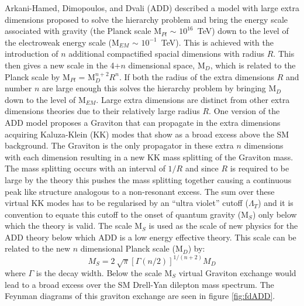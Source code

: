         Arkani-Hamed, Dimopoulos, and Dvali (ADD) \cite{ArkaniHamed:1998rs} described a model with large extra dimensions proposed to solve the hierarchy problem and bring the energy scale associated with gravity (the Planck scale M$_{Pl}$ $\sim$ $10^{16}$~TeV) down to the level of the electroweak energy scale (M$_{EM}$ $\sim$ $10^{-1}$~TeV). This is achieved with the introduction of $n$ additional compactified spacial dimensions with radius $R$. This then gives a new scale in the 4+$n$ dimensional space, M$_{D}$, which is related to the Planck scale by M$_{Pl}$ = M$_{D}^{n+2}R^{n}$. If both the radius of the extra dimensions $R$ and number $n$ are large enough this solves the hierarchy problem by bringing M$_{D}$ down to the level of M$_{EM}$. Large extra dimensions are distinct from other extra dimensions theories due to their relatively large radius $R$.
        One version of the ADD model proposes a Graviton that can propagate in the extra dimensions acquiring Kaluza-Klein (KK) modes that show as a broad excess above the SM background. The Graviton is the only propagator in these extra $n$ dimensions with each dimension resulting in a new KK mass splitting of the Graviton mass. The mass splitting occurs with an interval of $1/R$ and since $R$ is required to be large by the theory this pushes the mass splitting together causing a continuous peak like structure analogous to a non-resonant excess. The sum over these virtual KK modes has to be regularised by an ``ultra violet'' cutoff ($\Lambda_{T}$) and it is convention to equate this cutoff to the onset of quantum gravity (M$_{S}$) only below which the theory is valid. The scale M$_{S}$ is used as the scale of new physics for the ADD theory below which ADD is a low energy effective theory. This scale can be related to the new $n$ dimensional Planck scale (M$_{D}$) by:
        \begin{equation}
            M_{S} = 2~\sqrt{\pi}\left[{\Gamma (n/2)}\right]^{1/(n+2)}M_{D}
            \label{eq:gravScale}
        \end{equation}
        where $\Gamma$ is the decay width. Below the scale M$_{S}$ virtual Graviton exchange would lead to a broad excess over the SM Drell-Yan dilepton mass spectrum. The Feynman diagrams of this graviton exchange are seen in figure \ref{fig:fdADD}.

